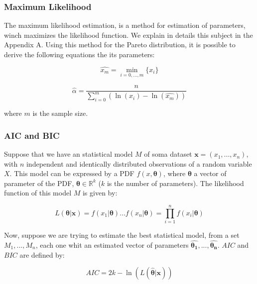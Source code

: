 \subsubsection{Maximum Likelihood}

The maximum likelihood estimation, is a method for estimation of parameters, winch maximizes the likelihood function. We explain in details this subject in the Appendix A. Using this method for the Pareto distribution, it is possible to derive the following equations the its parameters:

\begin{equation}
\hat{x_{m}} = \min_{i = 0, ..., m}\{x_{i}\}
\end{equation} 

\begin{equation}
\hat{\alpha} = \frac{n}{ \sum_{i = 0}^{m}(\ln{(x_{i}) - \ln(\hat{x_{m}})})  }
\end{equation} 

where $m$ is the sample size.


\subsubsection{AIC and BIC}

 Suppose that we have an statistical model $M$ of soma dataset ${\boldsymbol{x} = (x_1, ..., x_n)}$, with $n$ independent and identically distributed observations of a random variable $X$. This model can be expressed by a PDF $f(x, \boldsymbol{\theta})$, where $\boldsymbol{\theta}$ a vector of parameter of the PDF, $\boldsymbol{\theta} \in \mathbb{R}^{k}$ ($k$ is the number of parameters). The  likelihood function  of this model $M$ is given by:

\begin{equation}
L(\boldsymbol{\theta}|\boldsymbol{x} ) =  f(x_1|\boldsymbol{\theta})...f(x_n|\boldsymbol{\theta}) = \prod_{i = 1}^{n}f(x_i|\boldsymbol{\theta})
\end{equation}

Now, suppose we are trying to estimate the best statistical model, from a set ${M_1, ..., M_n}$, each one whit an estimated vector of parameters  ${\boldsymbol{\hat{\theta_1}}}, ..., {\boldsymbol{\hat{\theta_n}}}$. $AIC$ and $BIC$ are defined by:

\begin{equation}
AIC = 2k - \ln(L(\boldsymbol{\hat{\theta}}|\boldsymbol{x}))
\end{equation}

